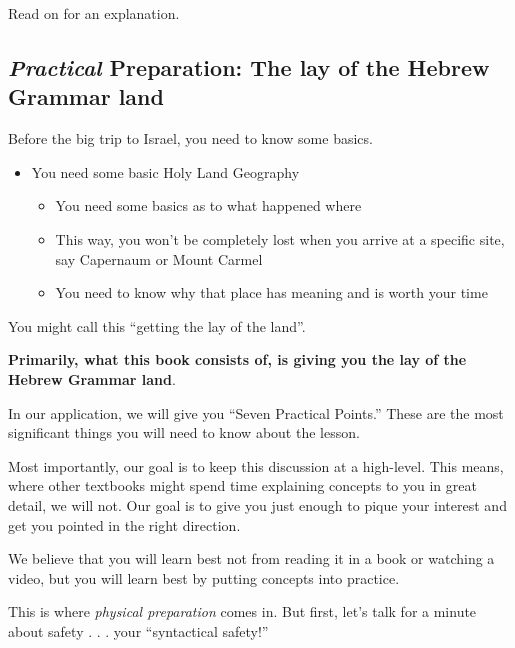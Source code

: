 \documentclass[
]{turabian-researchpaper}
\providecommand{\tightlist}{%
  \setlength{\itemsep}{0pt}\setlength{\parskip}{0pt}}
\begin{document}
Read on for an explanation.

\hypertarget{practical-preparation-the-lay-of-the-hebrew-grammar-land}{%
\subsection*{\texorpdfstring{\emph{Practical} Preparation: The lay of the Hebrew Grammar land}{Practical Preparation: The lay of the Hebrew Grammar land}}\label{practical-preparation-the-lay-of-the-hebrew-grammar-land}}

Before the big trip to Israel, you need to know some basics.

\begin{itemize}
\tightlist
\item
  You need some basic Holy Land Geography

  \begin{itemize}
  \tightlist
  \item
    You need some basics as to what happened where
  \item
    This way, you won't be completely lost when you arrive at a specific site, say Capernaum or Mount Carmel
  \item
    You need to know why that place has meaning and is worth your time
  \end{itemize}
\end{itemize}

You might call this ``getting the lay of the land''.

\textbf{Primarily, what this book consists of, is giving you the lay of the Hebrew Grammar land}.

In our application, we will give you ``Seven Practical Points.'' These are the most significant things you will need to know about the lesson.

Most importantly, our goal is to keep this discussion at a high-level. This means, where other textbooks might spend time explaining concepts to you in great detail, we will not. Our goal is to give you just enough to pique your interest and get you pointed in the right direction.

We believe that you will learn best not from reading it in a book or watching a video, but you will learn best by putting concepts into practice.

This is where \emph{physical preparation} comes in. But first, let's talk for a minute about safety . . . your ``syntactical safety!''
\end{document}
